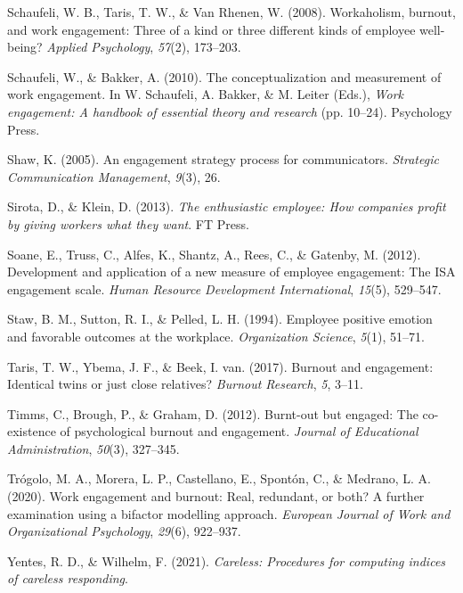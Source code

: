 \documentclass[
  man]{apa6}
\newlength{\cslhangindent}
\newlength{\cslentryspacingunit} %
\newenvironment{CSLReferences}[2] %
 {%
  \setlength{\parindent}{0pt}
  \ifodd #1
  \let\oldpar\par
  \def\par{\hangindent=\cslhangindent\oldpar}
  \fi
  \setlength{\parskip}{#2\cslentryspacingunit}
 }%
 {}
\begin{document}
\begin{CSLReferences}{1}{0}
\leavevmode{}%
Schaufeli, W. B., Taris, T. W., \& Van Rhenen, W. (2008). Workaholism, burnout, and work engagement: Three of a kind or three different kinds of employee well-being? \emph{Applied Psychology}, \emph{57}(2), 173--203.

\leavevmode{}%
Schaufeli, W., \& Bakker, A. (2010). The conceptualization and measurement of work engagement. In W. Schaufeli, A. Bakker, \& M. Leiter (Eds.), \emph{Work engagement: A handbook of essential theory and research} (pp. 10--24). Psychology Press.

\leavevmode{}%
Shaw, K. (2005). An engagement strategy process for communicators. \emph{Strategic Communication Management}, \emph{9}(3), 26.

\leavevmode{}%
Sirota, D., \& Klein, D. (2013). \emph{The enthusiastic employee: How companies profit by giving workers what they want}. FT Press.

\leavevmode{}%
Soane, E., Truss, C., Alfes, K., Shantz, A., Rees, C., \& Gatenby, M. (2012). Development and application of a new measure of employee engagement: The ISA engagement scale. \emph{Human Resource Development International}, \emph{15}(5), 529--547.

\leavevmode{}%
Staw, B. M., Sutton, R. I., \& Pelled, L. H. (1994). Employee positive emotion and favorable outcomes at the workplace. \emph{Organization Science}, \emph{5}(1), 51--71.

\leavevmode{}%
Taris, T. W., Ybema, J. F., \& Beek, I. van. (2017). Burnout and engagement: Identical twins or just close relatives? \emph{Burnout Research}, \emph{5}, 3--11.

\leavevmode{}%
Timms, C., Brough, P., \& Graham, D. (2012). Burnt-out but engaged: The co-existence of psychological burnout and engagement. \emph{Journal of Educational Administration}, \emph{50}(3), 327--345.

\leavevmode{}%
Trógolo, M. A., Morera, L. P., Castellano, E., Spontón, C., \& Medrano, L. A. (2020). Work engagement and burnout: Real, redundant, or both? A further examination using a bifactor modelling approach. \emph{European Journal of Work and Organizational Psychology}, \emph{29}(6), 922--937.

\leavevmode{}%
Yentes, R. D., \& Wilhelm, F. (2021). \emph{Careless: Procedures for computing indices of careless responding}.

\end{CSLReferences}
\end{document}
